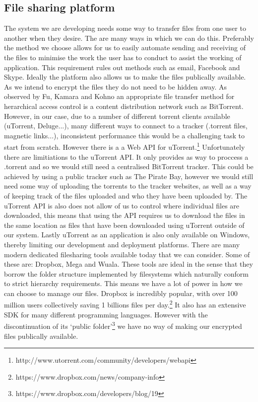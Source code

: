 \documentclass[12pt, titlepage]{article}
\begin{document}
\subsection{File sharing platform}
The system we are developing needs some way to transfer files from one user to another when they desire. The are many ways in which we can do this. Preferably the method we choose allows for us to easily automate sending and receiving of the files to minimise the work the user has to conduct to assist the working of application. This requirement rules out methods such as email, Facebook and Skype. Ideally the platform also allows us to make the files publically available. As we intend to encrypt the files they do not need to be hidden away.
\newline \indent As observed by Fu, Kamara and Kohno an appropriate file transfer method for herarchical access control is a content distribution network such as BitTorrent.\cite{bittorrent} However, in our case, due to a number of different torrent clients available (uTorrent, Deluge...), many different ways to connect to a tracker (.torrent files, magnetic links...), inconsistent performance this would be a challenging task to start from scratch. However there is a a Web API for uTorrent.\footnote{http://www.utorrent.com/community/developers/webapi} Unfortunately there are limitiations to the uTorrent API. It only provides as way to proccess a .torrent and so we would still need a centralised BitTorrent tracker. This could be achieved by using a public tracker such as The Pirate Bay, however we would still need some way of uploading the torrents to the tracker websites, as well as a way of keeping track of the files uploaded and who they have been uploaded by. The uTorrent API is also does not allow of us to control where individual files are downloaded, this means that using the API requires us to download the files in the same location as files that have been downloaded using uTorrent outside of our system. Lastly uTorrent as an application is also only available on Windows, thereby limiting our development and deployment platforms.
\newline \indent There are many modern dedicated filesharing tools available today that we can consider. Some of these are: Dropbox, Mega and Wuala. These tools are ideal in the sense that they borrow the folder structure implemented by filesystems which naturally conform to strict hierarchy requirements. This means we have a lot of power in how we can choose to manage our files. Dropbox is incredibly popular, with over 100 million users collectively saving 1 billions files per day.\footnote{https://www.dropbox.com/news/company-info} It also has an extensive SDK for many different programming languages. However with the discontinuation of its `public folder'\footnote{https://www.dropbox.com/developers/blog/19} we have no way of making our encrypted files publically available.
\end{document}
